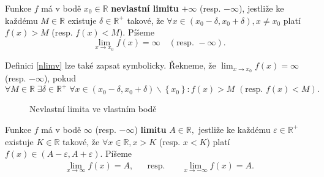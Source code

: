\begin{definition}\label{nlimv}
Funkce $f$ má v bodě $x_0\in \mathbb R$ \textbf{nevlastní limitu} $+\infty$ (resp.
$-\infty$),
jestliže ke každému $M \in \mathbb R$ existuje
$\delta \in \mathbb R^+$ takové, že $\forall x \in
\left ( x_0-\delta, x_0+\delta \right ), x\ne x_0 $ platí $f(x)>M $
(resp. $f(x)<M$). Píšeme
$$\lim_{x\to x_0}f(x)=\infty \quad(\textrm{resp. } -\infty).$$
\end{definition}

\begin{pozn}
    Definici \ref{nlimv} lze také zapsat symbolicky. Řekneme, že
    $\lim_{x\to x_0} f(x) =\infty$ (resp. $-\infty$), pokud
    $$\forall M \in \mathbb R\; \exists \delta \in \mathbb R^+\; \forall x \in \left ( x_0-\delta,x_0+\delta \right )\smallsetminus\left \{ x_0 \right \}\colon f(x) > M \,\, (\textrm{resp. } f(x) < M).$$
\end{pozn}

\begin{figure}[ht!]
\centering
{}
\caption{Nevlastní limita ve vlastním bodě}
\end{figure}

\begin{definition}\label{vlimn}
Funkce $f$ má v bodě $\infty$ (resp. $-\infty$) \textbf{limitu} $A\in \mathbb R,$
jestliže ke každému $\varepsilon \in \mathbb R^+$ existuje
$K \in \mathbb R$ takové, že $\forall x \in \mathbb R, x > K$ (resp. $x<K$)
platí $f(x)\in \left ( A-\varepsilon,A+\varepsilon \right ). $ Píšeme
\begin{align*}
\lim_{x\to \infty}f(x)=A, & & \textrm{resp. }  && \lim_{x\to -\infty}f(x)=A.
\end{align*}
\end{definition}

